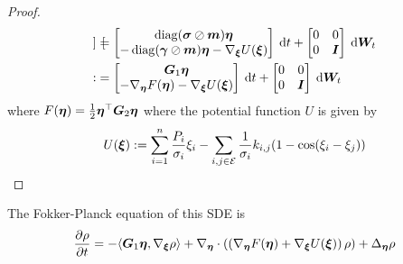 \documentclass[11pt,twoside,a4paper]{article}
\begin{document}
\begin{proof}
\begin{align}
\begin{bmatrix}
\end{bmatrix}
&= 
\begin{bmatrix}
\operatorname{diag}({\bm{\sigma}} \oslash {\bm{m}}) {\bm{\eta}} \\
- \operatorname{diag}({\bm{\gamma}} \oslash {\bm{m}}) {\bm{\eta}}- \nabla_{{\bm{\xi}}} U({\bm{\xi}}) 
   \end{bmatrix}
   \: {\rm{d}} t
   + \begin{bmatrix}
    0 & 0 \\ 
    0 & {\bm{I}}
    \end{bmatrix} \: {\rm{d}} \bm{W}_t \\ 
    :&=\begin{bmatrix}
 \bm{G}_1 {\bm{\eta}} \\
 -\nabla _{{\bm{\eta}}} F({\bm{\eta}})  - \nabla_{{\bm{\xi}}} U({\bm{\xi}})
\end{bmatrix} \: {\rm{d}} t   + \begin{bmatrix}
    0 & 0 \\ 
    0 & {\bm{I}}
    \end{bmatrix} \: {\rm{d}} \bm{W}_t
\end{align}
where $F({\bm{\eta}}) =\frac{1}{2} {\bm{\eta}}^{\top} \bm{G}_2 {\bm{\eta}}$
where the potential function $U$ is given by 
\begin{align}
U({\bm{\xi}}):= \sum_{i=1}^{n} \frac{P_i}{\sigma_i} \xi_i - \sum_{i,j\in \mathcal{E}}\frac{1}{\sigma_i} k_{i,j}(1-\cos(\xi_i-\xi_j))\end{align}
\end{proof}

The Fokker-Planck equation of this SDE is 
\begin{align}
    \frac{\partial \rho}{\partial t} = -\langle \bm{G}_1{\bm{\eta}}, \nabla_{{\bm{\xi}}} \rho\rangle + \nabla_{{\bm{\eta}}} \cdot \left( \left( \nabla _{{\bm{\eta}}}F({\bm{\eta}})  + \nabla_{{\bm{\xi}}} U({\bm{\xi}})
    \right) \rho\right) + \Delta_{{\bm{\eta}}} \rho
 \end{align}
\end{document}
